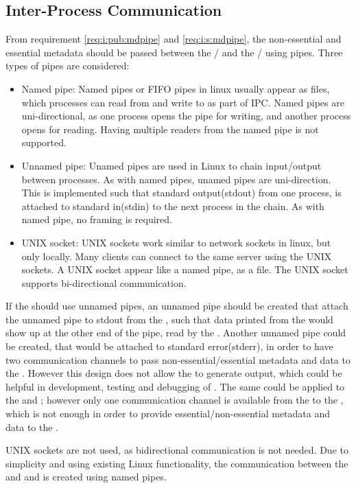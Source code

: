 \subsection{Inter-Process Communication} \label{sec:implementation:ipc}
From requirement \ref{req:i:pub:mdpipe} and \ref{req:i:s:mdpipe}, the non-essential and essential metadata should be passed between the \pub{}/\sub{} and the \con{}/\pro{} using pipes. Three types of pipes are considered:
\begin{itemize}
	\item Named pipe: Named pipes or FIFO pipes in linux usually appear as files, which processes can read from and write to as part of \ac{IPC}. Named pipes are uni-directional, as one process opens the pipe for writing, and another process opens for reading. Having multiple readers from the named pipe is not supported.
	
	\item Unnamed pipe: Unamed pipes are used in Linux to chain input/output between processes. As with named pipes, unamed pipes are uni-direction. This is implemented such that standard output(stdout) from one process, is attached to standard in(stdin) to the next process in the chain. As with named pipe, no framing is required.
	
	\item UNIX socket: UNIX sockets work similar to network sockets in linux, but only locally. Many clients can connect to the same server using the UNIX sockets. A UNIX socket appear like a named pipe, as a file. The UNIX socket supports bi-directional communication. 
\end{itemize}

If the \pub{} should use unnamed pipes, an unnamed pipe should be created that attach the unnamed pipe to stdout from the \pro{}, such that data printed from the \pro{} would show up at the other end of the pipe, read by the \pub{}. Another unnamed pipe could be created, that would be attached to standard error(stderr), in order to have two communication channels to pass non-essential/essential metadata and data to the \pub{}. However this design does not allow the \pro{} to generate output, which could be helpful in development, testing and debugging of \pros{}. The same could be applied to the \sub{} and \con{}; however only one communication channel is available from the \sub{} to the \con{}, which is not enough in order to provide essential/non-essential metadata and data to the \con{}.

UNIX sockets are not used, as bidirectional communication is not needed. Due to simplicity and using existing Linux functionality, the communication between the \pubs{} \subs{} and \con{} and \pro{} is created using named pipes. 



